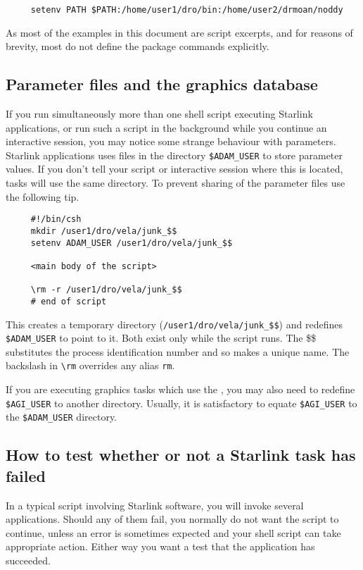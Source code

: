 \small
\begin{verbatim}
     setenv PATH $PATH:/home/user1/dro/bin:/home/user2/drmoan/noddy
\end{verbatim}
\normalsize
As most of the examples in this document are script excerpts, and for
reasons of brevity, most do not define the package commands explicitly.

\newpage
\subsection{Parameter files and the
graphics database}\label{sc4_se_multi_param}

If you run simultaneously more than one shell script executing
Starlink applications, or run such a script in the background while
you continue an interactive session, you may notice some strange
behaviour with parameters.   Starlink applications uses files in
the directory {\tt \$ADAM\_USER} to store parameter values.  If you don't
tell your script or interactive session where this is located,
tasks will use the same directory.  To prevent sharing of the
parameter files use the following tip.

\begin{verbatim}
     #!/bin/csh
     mkdir /user1/dro/vela/junk_$$
     setenv ADAM_USER /user1/dro/vela/junk_$$

     <main body of the script>

     \rm -r /user1/dro/vela/junk_$$
     # end of script
\end{verbatim}
This creates a temporary directory ({\tt /user1/dro/vela/junk\_\$\$})
and redefines {\tt \$ADAM\_USER} to point to it.  Both exist only while the
script runs.  The \$\$ substitutes the process identification number
and so makes a unique name.  The backslash in \verb+\rm+ overrides
any alias {\tt rm}.

If you are executing graphics tasks which use the , you may also need to redefine {\tt
\$AGI\_USER} to another directory.  Usually, it is satisfactory to 
equate {\tt \$AGI\_USER} to the {\tt \$ADAM\_USER} directory.

\subsection{How to test whether or not a
Starlink task has failed}\label{sc4_se_exit_status}

In a typical script involving Starlink software, you will invoke
several applications.  Should any of them fail, you normally do not
want the script to continue, unless an error is sometimes expected and
your shell script can take appropriate action.  Either way you want a
test that the application has succeeded.  

